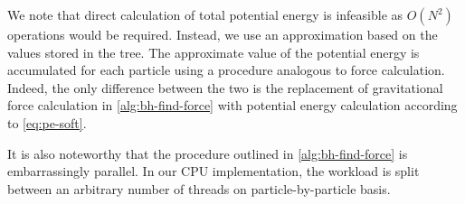 We note that direct calculation of total potential energy is infeasible as $O(N^2)$ operations would be required.
Instead, we use an approximation based on the values stored in the tree.
The approximate value of the potential energy is accumulated for each particle using a procedure analogous to force calculation.
Indeed, the only difference between the two is the replacement of gravitational force calculation in \autoref{alg:bh-find-force} with potential energy calculation according to \autoref{eq:pe-soft}.

It is also noteworthy that the procedure outlined in \autoref{alg:bh-find-force} is embarrassingly parallel.
In our CPU implementation, the workload is split between an arbitrary number of threads on particle-by-particle basis.